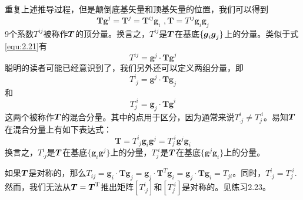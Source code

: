重复上述推导过程，但是颠倒底基矢量和顶基矢量的位置，我们可以得到
\begin{equation}
    \boldsymbol{Tg}^j=\boldsymbol{T}^j=\boldsymbol{T}^{ij}\boldsymbol{g}_i\,\, ,  \boldsymbol{T}=T^{ij}\boldsymbol{g}_i\boldsymbol{g}_j
\end{equation}
9个系数$T^{ij}$被称作$\boldsymbol{T}$的顶分量。换言之，$T^{ij}$是$\boldsymbol{T}$在基底$\{\boldsymbol{g}_{i}\boldsymbol{g}_{j}\}$上的分量。类似于式\eqref{equ:2.21}有
\begin{equation}
    T^{ij}=\boldsymbol{g}^j\cdot \boldsymbol{Tg}^j
\end{equation}
聪明的读者可能已经意识到了，我们另外还可以定义两组分量，即
\begin{equation}
    T_{\cdot j}^{i}=\boldsymbol{g}^j\cdot \boldsymbol{Tg}_j
\end{equation}
和
\begin{equation}
    T_{j}^{\cdot i}=\boldsymbol{g}_j\cdot \boldsymbol{Tg}^i
\end{equation}
这两个被称作$\boldsymbol{T}$的混合分量。其中的点用于区分，因为通常来说$T^{i}_{\cdot j}\ne T^{\cdot i}_{j}$。易知$\boldsymbol{T}$在混合分量上有如下表达式：
\begin{equation}
    \boldsymbol{T}=T_{\cdot j}^{i}\boldsymbol{g}_i\boldsymbol{g}^j=T_{j}^{\cdot i}\boldsymbol{g}^j\boldsymbol{g}_i
\end{equation}
换言之，$T_{\cdot j}^{i}$是$\boldsymbol{T}$在基底$\{\boldsymbol{g}_i\boldsymbol{g}^j\}$上的分量，$T_{j}^{\cdot i}$是$\boldsymbol{T}$在基底$\{\boldsymbol{g}^j\boldsymbol{g}_i\}$上的分量。

如果$\boldsymbol{T}$是对称的，那么$T_{ij}=\boldsymbol{g}_i\cdot \boldsymbol{Tg}_j=\boldsymbol{g}_j\cdot \boldsymbol{T}^T\boldsymbol{g}_i=\boldsymbol{g}_j\cdot \boldsymbol{Tg}_i=T_{ji}$。同时，$T_{\cdot j}^{i}=T_{j}^{\cdot i}$.然而，我们无法从$\boldsymbol{T}=\boldsymbol{T}^{\mathrm{T}}$推出矩阵$\left[ T_{\cdot j}^{i} \right] $和$\left[ T_{j}^{\cdot i} \right] $是对称的。见练习2.23。

